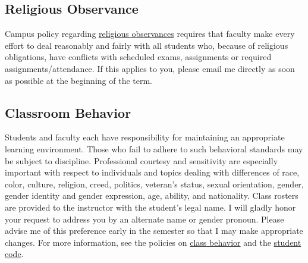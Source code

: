 \documentclass[10pt]{memoir}
\begin{document}
\subsection{Religious Observance}
Campus policy regarding \href{http://www.colorado.edu/policies/observance-religious-holidays-and-absences-classes-andor-exams}{religious observances} requires that faculty make every effort to deal reasonably and fairly with all students who, because of religious obligations, have conflicts with scheduled exams, assignments or required assignments/attendance. If this applies to you, please email me directly as soon as possible at the beginning of the term. 

\subsection{Classroom Behavior}
Students and faculty each have responsibility for maintaining an appropriate learning environment. Those who fail to adhere to such behavioral standards may be subject to discipline. Professional courtesy and sensitivity are especially important with respect to individuals and topics dealing with differences of race, color, culture, religion, creed, politics, veteran’s status, sexual orientation, gender, gender identity and gender expression, age, ability, and nationality.  Class rosters are provided to the instructor with the student's legal name. I will gladly honor your request to address you by an alternate name or gender pronoun. Please advise me of this preference early in the semester so that I may make appropriate changes. For more information, see the policies on \href{http://www.colorado.edu/policies/student-classroom-and-course-related-behavior}{class behavior} and the \href{http://www.colorado.edu/osc/#student_code}{student code}.
\end{document}

